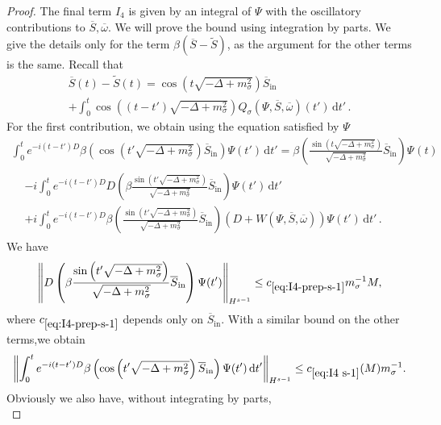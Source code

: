 \documentclass[AHL,Unicode,longabstracts,published]{cedram}
\newcommand{\rmin}{\mathrm{in}}
\renewcommand\d[1]{{\ensuremath{\,\text{d}#1}}}
\begin{document}
\begin{proof}
The final term $I_4$ is given by an integral of $\Psi$ with the oscillatory contributions to $\overline{S}, \overline{\omega}$. We will prove the bound using integration by parts. We give the details only for the term $\beta(\overline{S}-\widetilde{S})$, as the argument for the other terms is the same. Recall that
\begin{multline}
\overline{S}(t)-\widetilde{S}(t) =\cos\left(t\sqrt{-\Delta + m^2_\sigma}\right)\overline{S}_\rmin \\
+\int_0^t\cos\left((t-t')\sqrt{-\Delta + m^2_\sigma}\right) Q_\sigma(\Psi,\overline{S}, \overline{\omega})(t')\d t'\,.
\end{multline}
For the first contribution, we obtain using the equation satisfied by $\Psi$
\begin{multline*}
\int_0^t e^{-i(t-t')D}\beta \left(\cos(t'\sqrt{-\Delta + m^2_\sigma})\overline{S}_\rmin\right)\Psi(t') \d t'
=\beta\left(\frac{\sin\left(t\sqrt{-\Delta+m_\sigma^2}
\right)}{\sqrt{-\Delta+m_\sigma^2}}\overline{S}_\rmin\right)\Psi_{}(t)
\\
\begin{aligned}
&-i
\int_0^te^{-i(t-t')D}D\left(
\beta\frac{\sin \left(t'\sqrt{-\Delta+m_\sigma^2}\right)}{\sqrt{-\Delta+m_\sigma^2}}\overline{S}_\rmin\right)
\Psi(t')\d t'\\
&+ i
\int_0^te^{-i(t-t')D}\beta\left(\frac{\sin\left(t'\sqrt{-\Delta+m_\sigma^2}
\right)}{\sqrt{-\Delta+m_\sigma^2}}\overline{S}_\rmin\right)\left(D+W(\Psi, \overline{S}, \overline \omega)\right)\Psi(t')\d t'\,.
\end{aligned}
\end{multline*}
We have
\begin{equation}\label{eq:I4-prep-s-1}
\left\| D\left(
\beta\frac{\sin \left(t'\sqrt{-\Delta+m_\sigma^2}\right)}{\sqrt{-\Delta+m_\sigma^2}}\overline{S}_\rmin\right)
\Psi(t') \right\|_{H^{s-1}} \leq c_{\eqref{eq:I4-prep-s-1}} m_\sigma^{-1} M,
\end{equation}
where $c_{\eqref{eq:I4-prep-s-1}}$ depends only on $\overline{S}_\rmin$. With a similar bound on the other terms,\linebreak we obtain
\begin{equation}\label{eq:I4 s-1}
\left\| \int_0^t e^{-i(t-t')D}\beta \left(\cos\left(t'\sqrt{-\Delta + m^2_\sigma}\right)\overline{S}_\rmin\right)\Psi(t') \d t'\right\|_{H^{s-1}}
\leq c_{\eqref{eq:I4 s-1}}(M) m_\sigma^{-1}.
\end{equation}
Obviously we also have, without integrating by parts,
\begin{equation}\label{eq:I4 s}

\end{equation}
\end{proof}
\end{document}
